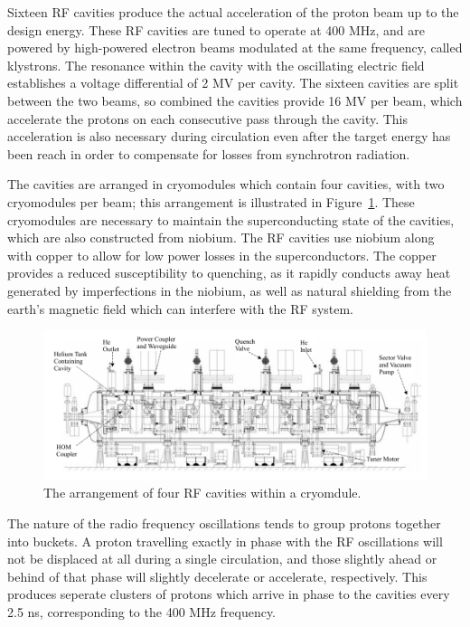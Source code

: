 Sixteen \ac{RF} cavities produce the  actual acceleration of the proton beam up to the design energy.
These \ac{RF} cavities are tuned to operate at 400 MHz, and are powered by high-powered electron beams modulated at the same frequency, called klystrons.
The resonance within the cavity with the oscillating electric field establishes a voltage differential of 2 MV per cavity.
The sixteen cavities are split between the two beams, so combined the cavities provide 16 MV per beam, which accelerate the protons on each consecutive pass through the cavity.
This acceleration is also necessary during circulation even after the target energy has been reach in order to compensate for losses from synchrotron radiation.

The cavities are arranged in cryomodules which contain four cavities, with two cryomodules per beam; this arrangement is illustrated in Figure~\ref{fig:rfcavity}.
These cryomodules are necessary to maintain the superconducting state of the cavities, which are also constructed from niobium.
The \ac{RF} cavities use niobium along with copper to allow for low power losses in the superconductors.
The copper provides a reduced susceptibility to quenching, as it rapidly conducts away heat generated by imperfections in the niobium, as well as natural shielding from the earth's magnetic field which can interfere with the \ac{RF} system.

\begin{figure}
\centering
\includegraphics[width=\fullfig]{figures/rfcavity.png}
\caption{The arrangement of four \ac{RF} cavities within a cryomdule.}
\label{fig:rfcavity}
\end{figure}

The nature of the radio frequency oscillations tends to group protons together into buckets.
A proton travelling exactly in phase with the \ac{RF} oscillations will not be displaced at all during a single circulation, and those slightly ahead or behind of that phase will slightly decelerate or accelerate, respectively.
This produces seperate clusters of protons which arrive in phase to the cavities every 2.5 ns, corresponding to the 400 MHz frequency.

